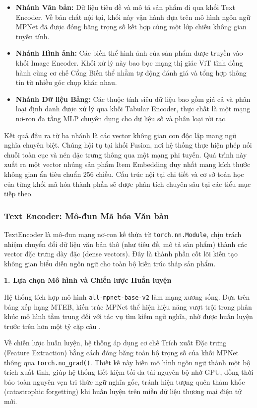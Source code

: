 \begin{itemize}
    \item \textbf{Nhánh Văn bản:} Dữ liệu tiêu đề và mô tả sản phẩm đi qua khối Text Encoder. Về bản chất nội tại, khối này vận hành dựa trên mô hình ngôn ngữ MPNet đã được đóng băng trọng số kết hợp cùng một lớp chiếu không gian tuyến tính.
    \item \textbf{Nhánh Hình ảnh:} Các biến thể hình ảnh của sản phẩm được truyền vào khối Image Encoder. Khối xử lý này bao bọc mạng thị giác ViT tĩnh đồng hành cùng cơ chế Cổng Biến thể nhằm tự động đánh giá và tổng hợp thông tin từ nhiều góc chụp khác nhau.
    \item \textbf{Nhánh Dữ liệu Bảng:} Các thuộc tính siêu dữ liệu bao gồm giá cả và phân loại định danh được xử lý qua khối Tabular Encoder, thực chất là một mạng nơ-ron đa tầng MLP chuyên dụng cho dữ liệu số và phân loại rời rạc.
\end{itemize}

Kết quả đầu ra từ ba nhánh là các vector không gian con độc lập mang ngữ nghĩa chuyên biệt. Chúng hội tụ tại khối Fusion, nơi hệ thống thực hiện phép nối chuỗi toàn cục và nén đặc trưng thông qua một mạng phi tuyến. Quá trình này xuất ra một vector nhúng sản phẩm Item Embedding duy nhất mang kích thước không gian ẩn tiêu chuẩn 256 chiều. Cấu trúc nội tại chi tiết và cơ sở toán học của từng khối mã hóa thành phần sẽ được phân tích chuyên sâu tại các tiểu mục tiếp theo.

\subsubsection{Text Encoder: Mô-đun Mã hóa Văn bản}

TextEncoder là mô-đun mạng nơ-ron kế thừa từ \texttt{torch.nn.Module}, chịu trách nhiệm chuyển đổi dữ liệu văn bản thô (như tiêu đề, mô tả sản phẩm) thành các vector đặc trưng dày đặc (dense vectors). Đây là thành phần cốt lõi kiến tạo không gian biểu diễn ngôn ngữ cho toàn bộ kiến trúc tháp sản phẩm.

\textbf{1. Lựa chọn Mô hình và Chiến lược Huấn luyện}

Hệ thống tích hợp mô hình \texttt{all-mpnet-base-v2} làm mạng xương sống. Dựa trên bảng xếp hạng MTEB, kiến trúc MPNet thể hiện hiệu năng vượt trội trong phân khúc mô hình tầm trung \cite{6} đối với tác vụ tìm kiếm ngữ nghĩa, nhờ được huấn luyện trước trên hơn một tỷ cặp câu \cite{10}. 

Về chiến lược huấn luyện, hệ thống áp dụng cơ chế Trích xuất Đặc trưng (Feature Extraction) bằng cách đóng băng toàn bộ trọng số của khối MPNet thông qua \texttt{torch.no\_grad()}. Thiết kế này biến mô hình ngôn ngữ thành một bộ trích xuất tĩnh, giúp hệ thống tiết kiệm tối đa tài nguyên bộ nhớ GPU, đồng thời bảo toàn nguyên vẹn tri thức ngữ nghĩa gốc, tránh hiện tượng quên thảm khốc (catastrophic forgetting) khi huấn luyện trên miền dữ liệu thương mại điện tử mới.

